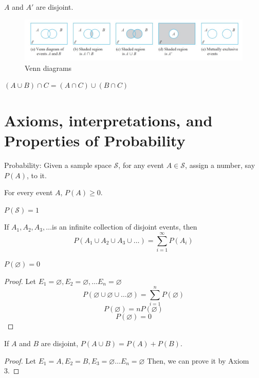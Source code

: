 \begin{prop}
$A$ and $A'$ are disjoint.
\end{prop}


\begin{figure}[H]
\includegraphics[width=15cm]{figures/venn_diagram.jpg}
\caption{Venn diagrams}
\label{fig:4}
\end{figure}

\begin{exmp}
  $(A\cup B)\cap C=(A \cap C)\cup(B \cap C)$
\end{exmp}


\section{Axioms, interpretations, and Properties of Probability}
Probability: Given a sample space $\mathcal{S}$, for any event $A\in \mathcal{S}$, assign a number, say $P(A)$, to it.
\begin{axio}
  For every event $A$, $P(A)\geq 0$.
\end{axio}

\begin{axio}
  $P(\mathcal{S})=1$
\end{axio}

\begin{axio}
If $A_1, A_2,A_3,\dots$is an infinite collection of disjoint events, then 
\[  P(A_1 \cup A_2\cup A_3 \cup \dots)=\sum_{i=1}^{\infty}P(A_i)
\]
\end{axio}

\begin{prop}
$P(\varnothing)=0$
\begin{proof}
Let $E_1=\varnothing,E_2=\varnothing,\dots E_n=\varnothing$
\[P(\varnothing \cup \varnothing \cup \dots \varnothing)=\sum_{i=1}^n P(\varnothing)\]
\[P(\varnothing)=nP(\varnothing)\]
\[P(\varnothing)=0\]
\end{proof}
\end{prop}

\begin{prop}
If $A$ and $B$ are disjoint, $P(A \cup B)=P(A)+P(B)$.
\begin{proof}
Let $E_1=A,E_2=B,E_3=\varnothing \dots E_n=\varnothing$
Then, we can prove it by Axiom 3.
\end{proof}
\end{prop}

